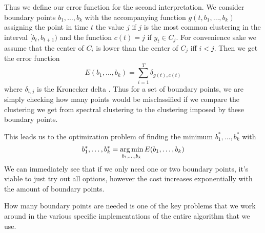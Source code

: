 Thus we define our error function for the second interpretation. We consider boundary points $b_1,\ldots,b_k$ with the accompanying function $g(t,b_1,\ldots,b_k)$ assigning the point in time $t$ the value $j$ if $j$ is the most common clustering in the interval $[b_t,b_{t+1})$ and the function $c(t)=j$ if $y_t \in C_j$. For convenience sake we assume that the center of $C_i$ is lower than the center of $C_j$ iff  $i<j$. Then we get the error function 
\[
E(b_1,\ldots,b_k)=\sum_{i=1}^T \delta_{g(t),c(t)}
\]
where $\delta_{i,j}$ is the Kronecker delta . Thus for a set of boundary points, we are simply checking how many points would be misclassified if we compare the clustering we get from spectral clustering to the clustering imposed by these boundary points.

This leads us to the optimization problem of finding the minimum $b^*_1,\ldots,b^*_k$ with 
\[
b_1^*,\ldots,b_k^*=\operatorname*{arg\,min}_{b_1,\ldots,b_k} E(b_1,\ldots,b_k) 
\]
We can immediately see that if we only need one or two boundary points, it's viable to just try out all options, however the cost increases exponentially with the amount of boundary points.


How many boundary points are needed is one of the key problems that we work around in the various specific implementations of the entire algorithm that we use. 
